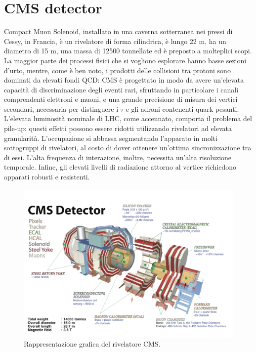 \section{CMS detector}

Compact Muon Solenoid, installato in una caverna sotterranea nei pressi di Cessy, in Francia, \`e un rivelatore di forma cilindrica, \`e lungo 22 m, ha un diametro di 15 m, una massa di 12500 tonnellate ed \`e preposto a molteplici scopi. La maggior parte dei processi fisici che si vogliono esplorare hanno basse sezioni d'urto, mentre, come \`e ben noto, i prodotti delle collisioni tra protoni sono dominati da elevati fondi QCD: CMS \`e progettato in modo da avere un'elevata capacit\`a di discriminazione degli eventi rari, sfruttando in particolare i canali comprendenti elettroni e muoni, e una grande precisione di misura dei vertici secondari, necessaria per distinguere i $\tau$ e gli adroni contenenti quark pesanti. L'elevata luminosit\`a nominale di LHC, come accennato, comporta il problema del pile-up: questi effetti possono essere ridotti utilizzando rivelatori ad elevata granularit\`a. L'occupazione si abbassa segmentando l'apparato in molti sottogruppi di rivelatori, al costo di dover ottenere un'ottima sincronizzazione tra di essi. L'alta frequenza di interazione, inoltre, necessita un'alta risoluzione temporale. Infine, gli elevati livelli di radiazione attorno al vertice richiedono apparati robusti e resistenti.

\begin{figure}[!htb]
  \centering
    \includegraphics[width=.99\textwidth]{figures/cms_3d.png}
  \caption{Rappresentazione grafica del rivelatore CMS.}
  \label{fig:CMS_1}
\end{figure}

